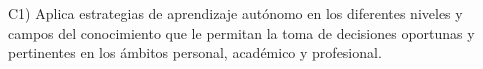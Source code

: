 C1) Aplica estrategias de aprendizaje aut\'{o}nomo en los diferentes
niveles y campos del conocimiento que le permitan la toma de
decisiones oportunas y pertinentes en los \'{a}mbitos personal, acad\'{e}mico
y profesional.
